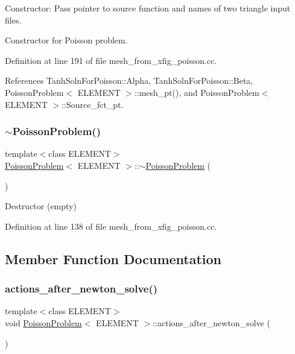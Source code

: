 Constructor\+: Pass pointer to source function and names of two triangle input files. 

Constructor for Poisson problem. 

Definition at line 191 of file mesh\+\_\+from\+\_\+xfig\+\_\+poisson.\+cc.



References Tanh\+Soln\+For\+Poisson\+::\+Alpha, Tanh\+Soln\+For\+Poisson\+::\+Beta, Poisson\+Problem$<$ E\+L\+E\+M\+E\+N\+T $>$\+::mesh\+\_\+pt(), and Poisson\+Problem$<$ E\+L\+E\+M\+E\+N\+T $>$\+::\+Source\+\_\+fct\+\_\+pt.

\mbox{\label{classPoissonProblem_ac247e42d2d292200617f4b9db7ed1ab8}} 
\subsubsection{\texorpdfstring{$\sim$\+Poisson\+Problem()}{~PoissonProblem()}}
{\footnotesize\ttfamily template$<$class E\+L\+E\+M\+E\+NT$>$ \\
\hyperlink{classPoissonProblem}{Poisson\+Problem}$<$ E\+L\+E\+M\+E\+NT $>$\+::$\sim$\hyperlink{classPoissonProblem}{Poisson\+Problem} (\begin{DoxyParamCaption}{ }\end{DoxyParamCaption})\hspace{0.3cm}{\ttfamily [inline]}}



Destructor (empty) 



Definition at line 138 of file mesh\+\_\+from\+\_\+xfig\+\_\+poisson.\+cc.



\subsection{Member Function Documentation}
\mbox{\label{classPoissonProblem_a7a9478d8e1e5c7d3a886b00ab7d50bbd}} 
\subsubsection{\texorpdfstring{actions\+\_\+after\+\_\+newton\+\_\+solve()}{actions\_after\_newton\_solve()}}
{\footnotesize\ttfamily template$<$class E\+L\+E\+M\+E\+NT$>$ \\
void \hyperlink{classPoissonProblem}{Poisson\+Problem}$<$ E\+L\+E\+M\+E\+NT $>$\+::actions\+\_\+after\+\_\+newton\+\_\+solve (\begin{DoxyParamCaption}{ }\end{DoxyParamCaption})\hspace{0.3cm}{\ttfamily [inline]}}



